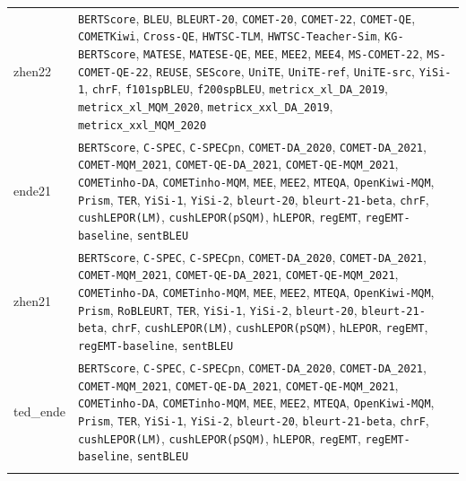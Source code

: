 \documentclass[11pt]{article}
\begin{document}
\begin{table}[t]
\begin{tabular}{l p{}}
\addlinespace
zhen22 & \texttt{BERTScore}, \texttt{BLEU}, \texttt{BLEURT-20}, \texttt{COMET-20}, \texttt{COMET-22}, \texttt{COMET-QE}, \texttt{COMETKiwi}, \texttt{Cross-QE}, \texttt{HWTSC-TLM}, \texttt{HWTSC-Teacher-Sim}, \texttt{KG-BERTScore}, \texttt{MATESE}, \texttt{MATESE-QE}, \texttt{MEE}, \texttt{MEE2}, \texttt{MEE4}, \texttt{MS-COMET-22}, \texttt{MS-COMET-QE-22}, \texttt{REUSE}, \texttt{SEScore}, \texttt{UniTE}, \texttt{UniTE-ref}, \texttt{UniTE-src}, \texttt{YiSi-1}, \texttt{chrF}, \texttt{f101spBLEU}, \texttt{f200spBLEU}, \texttt{metricx\_xl\_DA\_2019}, \texttt{metricx\_xl\_MQM\_2020}, \texttt{metricx\_xxl\_DA\_2019}, \texttt{metricx\_xxl\_MQM\_2020} \\
\addlinespace
ende21 & \texttt{BERTScore}, \texttt{C-SPEC}, \texttt{C-SPECpn}, \texttt{COMET-DA\_2020}, \texttt{COMET-DA\_2021}, \texttt{COMET-MQM\_2021}, \texttt{COMET-QE-DA\_2021}, \texttt{COMET-QE-MQM\_2021}, \texttt{COMETinho-DA}, \texttt{COMETinho-MQM}, \texttt{MEE}, \texttt{MEE2}, \texttt{MTEQA}, \texttt{OpenKiwi-MQM}, \texttt{Prism}, \texttt{TER}, \texttt{YiSi-1}, \texttt{YiSi-2}, \texttt{bleurt-20}, \texttt{bleurt-21-beta}, \texttt{chrF}, \texttt{cushLEPOR(LM)}, \texttt{cushLEPOR(pSQM)}, \texttt{hLEPOR}, \texttt{regEMT}, \texttt{regEMT-baseline}, \texttt{sentBLEU} \\
\addlinespace
zhen21 & \texttt{BERTScore}, \texttt{C-SPEC}, \texttt{C-SPECpn}, \texttt{COMET-DA\_2020}, \texttt{COMET-DA\_2021}, \texttt{COMET-MQM\_2021}, \texttt{COMET-QE-DA\_2021}, \texttt{COMET-QE-MQM\_2021}, \texttt{COMETinho-DA}, \texttt{COMETinho-MQM}, \texttt{MEE}, \texttt{MEE2}, \texttt{MTEQA}, \texttt{OpenKiwi-MQM}, \texttt{Prism}, \texttt{RoBLEURT}, \texttt{TER}, \texttt{YiSi-1}, \texttt{YiSi-2}, \texttt{bleurt-20}, \texttt{bleurt-21-beta}, \texttt{chrF}, \texttt{cushLEPOR(LM)}, \texttt{cushLEPOR(pSQM)}, \texttt{hLEPOR}, \texttt{regEMT}, \texttt{regEMT-baseline}, \texttt{sentBLEU} \\
\addlinespace
ted\_ende & \texttt{BERTScore}, \texttt{C-SPEC}, \texttt{C-SPECpn}, \texttt{COMET-DA\_2020}, \texttt{COMET-DA\_2021}, \texttt{COMET-MQM\_2021}, \texttt{COMET-QE-DA\_2021}, \texttt{COMET-QE-MQM\_2021}, \texttt{COMETinho-DA}, \texttt{COMETinho-MQM}, \texttt{MEE}, \texttt{MEE2}, \texttt{MTEQA}, \texttt{OpenKiwi-MQM}, \texttt{Prism}, \texttt{TER}, \texttt{YiSi-1}, \texttt{YiSi-2}, \texttt{bleurt-20}, \texttt{bleurt-21-beta}, \texttt{chrF}, \texttt{cushLEPOR(LM)}, \texttt{cushLEPOR(pSQM)}, \texttt{hLEPOR}, \texttt{regEMT}, \texttt{regEMT-baseline}, \texttt{sentBLEU} \\
\addlinespace

\end{tabular}
\end{table}
\end{document}
